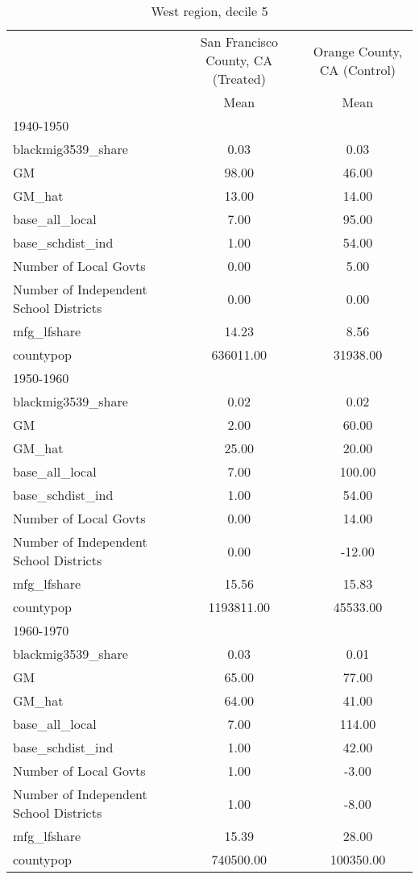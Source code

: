 \begin{table}[htbp]\centering
\def\sym#1{\ifmmode^{#1}\else\(^{#1}\)\fi}
\caption{West region, decile 5 \label{tab1}}
\begin{tabular}{l*{2}{c}}
\toprule
                    &\multicolumn{1}{c}{San Francisco County, CA (Treated)}&\multicolumn{1}{c}{Orange County, CA (Control)}\\
                    &        Mean&        Mean\\
\midrule
1940-1950           &            &            \\
blackmig3539\_share  &        0.03&        0.03\\
GM                  &       98.00&       46.00\\
GM\_hat              &       13.00&       14.00\\
base\_all\_local      &        7.00&       95.00\\
base\_schdist\_ind    &        1.00&       54.00\\
Number of Local Govts&        0.00&        5.00\\
Number of Independent School Districts&        0.00&        0.00\\
mfg\_lfshare         &       14.23&        8.56\\
countypop           &   636011.00&    31938.00\\
\midrule
1950-1960           &            &            \\
blackmig3539\_share  &        0.02&        0.02\\
GM                  &        2.00&       60.00\\
GM\_hat              &       25.00&       20.00\\
base\_all\_local      &        7.00&      100.00\\
base\_schdist\_ind    &        1.00&       54.00\\
Number of Local Govts&        0.00&       14.00\\
Number of Independent School Districts&        0.00&      -12.00\\
mfg\_lfshare         &       15.56&       15.83\\
countypop           &  1193811.00&    45533.00\\
\midrule
1960-1970           &            &            \\
blackmig3539\_share  &        0.03&        0.01\\
GM                  &       65.00&       77.00\\
GM\_hat              &       64.00&       41.00\\
base\_all\_local      &        7.00&      114.00\\
base\_schdist\_ind    &        1.00&       42.00\\
Number of Local Govts&        1.00&       -3.00\\
Number of Independent School Districts&        1.00&       -8.00\\
mfg\_lfshare         &       15.39&       28.00\\
countypop           &   740500.00&   100350.00\\
\bottomrule
\end{tabular}
\end{table}
